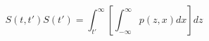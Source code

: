 \begin{equation}
S(t,t') S(t') = \int_{t'}^{\infty} \left[ \int_{-\infty}^\infty p(z,x) dx\right] dz
\end{equation}